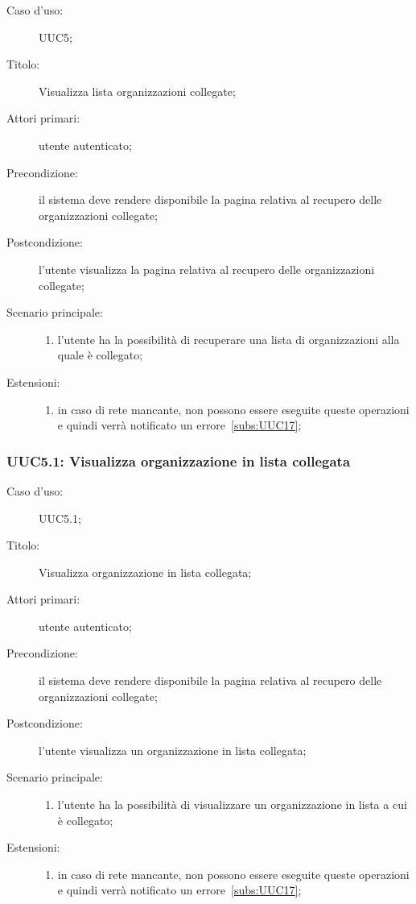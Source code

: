 \documentclass[../../../analisi-dei-requisiti.tex]{subfiles}
\begin{document}
\begin{description}
  \item[Caso d’uso:] UUC5;
  \item[Titolo:] Visualizza lista organizzazioni collegate;
  \item[Attori primari:] utente autenticato;
  \item[Precondizione:] il sistema deve rendere disponibile la pagina relativa al recupero delle organizzazioni collegate;
  \item[Postcondizione:] l'utente visualizza la pagina relativa al recupero delle organizzazioni collegate;
  \item[Scenario principale:]
        \begin{enumerate}
          \item l'utente ha la possibilità di recuperare una lista di organizzazioni alla quale è collegato;
        \end{enumerate}
  \item[Estensioni:]
        \begin{enumerate}
          \item in caso di rete mancante, non possono essere eseguite queste operazioni e quindi verrà notificato un errore~\ref{subs:UUC17};
        \end{enumerate}
\end{description}

\subsubsection{UUC5.1: Visualizza organizzazione in lista collegata}%
\label{subs:UUC5.1}
\begin{description}
  \item[Caso d’uso:] UUC5.1;
  \item[Titolo:] Visualizza organizzazione in lista collegata;
  \item[Attori primari:] utente autenticato;
  \item[Precondizione:] il sistema deve rendere disponibile la pagina relativa al recupero delle organizzazioni collegate;
  \item[Postcondizione:] l'utente visualizza un organizzazione in lista collegata;
  \item[Scenario principale:]
        \begin{enumerate}
          \item l'utente ha la possibilità di visualizzare un organizzazione in lista a cui è collegato;
        \end{enumerate}
  \item[Estensioni:]
        \begin{enumerate}
          \item in caso di rete mancante, non possono essere eseguite queste operazioni e quindi verrà notificato un errore~\ref{subs:UUC17};
        \end{enumerate}
\end{description}
\end{document}
